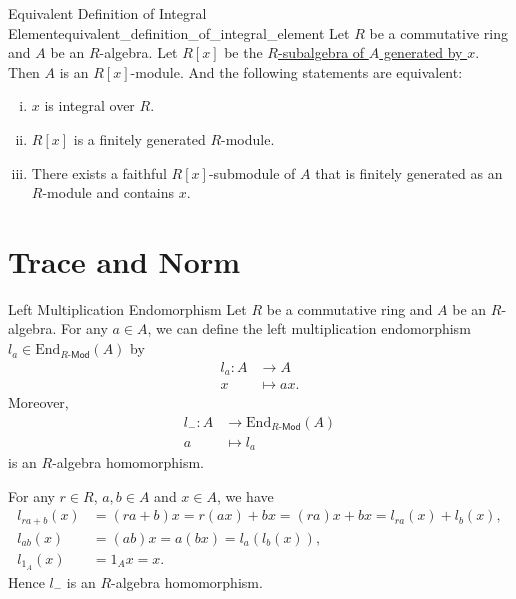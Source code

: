 \begin{proposition}{Equivalent Definition of Integral Element}{equivalent_definition_of_integral_element}
    Let $R$ be a commutative ring and $A$ be an $R$-algebra. Let $R[x]$ be the \hyperref[th:generated_subalgebra]{$R$-subalgebra of $A$ generated by $x$}. Then $A$ is an $R[x]$-module. And the following statements are equivalent:
    \begin{enumerate}[(i)]
        \item $x$ is integral over $R$.
        \item $R[x]$ is a finitely generated $R$-module.
        \item There exists a faithful $R[x]$-submodule of $A$ that is finitely generated as an $R$-module and contains $x$.
    \end{enumerate}
\end{proposition}

\section{Trace and Norm}

\begin{lemma}{Left Multiplication Endomorphism}{}
    Let $R$ be a commutative ring and $A$ be an $R$-algebra. For any $a\in A$, we can define the left multiplication endomorphism $l_a\in\mathrm{End}_{R\text{-}\mathsf{Mod}}(A)$ by
    \begin{align*}
        l_a:A &\longrightarrow A\\
        x &\longmapsto ax.
    \end{align*}
    Moreover,
    \begin{align*}
        l_{-}:A &\longrightarrow \mathrm{End}_{R\text{-}\mathsf{Mod}}(A)\\
        a &\longmapsto l_a
    \end{align*}
    is an $R$-algebra homomorphism.
\end{lemma}
\begin{prf}
    For any $r\in R$, $a,b\in A$ and $x\in A$, we have
    \begin{align*}
        l_{ra+b}(x)&=(ra+b)x=r(ax)+bx=(ra)x+bx=l_{ra}(x)+l_b(x),\\
        l_{ab}(x)&=(ab)x=a(bx)=l_a(l_b(x)),\\
        l_{1_A}(x)&=1_Ax=x.
    \end{align*}
    Hence $l_{-}$ is an $R$-algebra homomorphism.
\end{prf}


